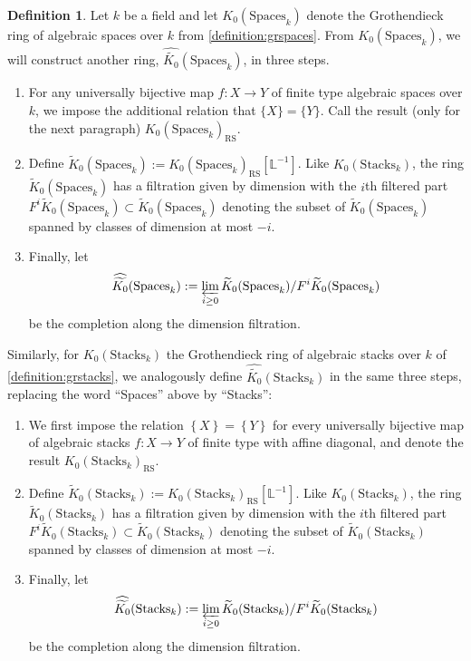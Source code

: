 \documentclass[12 pt]{amsart}
\newcommand{\rboxed}[1]{#1}
\theoremstyle{plain}
\theoremstyle{definition}
\newtheorem{definition}[theorem]{Definition}
\theoremstyle{remark}
\numberwithin{equation}{section}
\newcommand\bl{\mathbb L}
\newcommand\grSpaces{K_0(\mathrm{Spaces}_k)} %
\newcommand\grcSpaces{\widehat{\widetilde{K_0}}(\mathrm{Spaces}_k)} %
\newcommand\grStacks{K_0(\mathrm{Stacks}_k)} %
\newcommand\grcStacks{\widehat{\widetilde{K_0}}(\mathrm{Stacks}_k)} %
\begin{document}
\begin{definition}
	\label{definition:completed-grothendieck-ring} Let $k$ be a field and let $\rboxed{\grSpaces}$
	denote the Grothendieck ring of algebraic spaces over $k$ from
	\autoref{definition:grspaces}.  From
	$\grSpaces$, we will construct another ring, $\rboxed{\grcSpaces}$, in
	three steps.  
	\begin{enumerate}
		\item 	For any universally bijective map $f: X \to Y$ of
	finite type algebraic spaces over $k$, we impose the additional relation
	that $\{X\} = \{Y\}$.   Call the result  (only for the next paragraph)
	$\rboxed{K_0(\mathrm{Spaces}_k)_{\operatorname{RS}}}$.  
\item  Define
	$\rboxed{\widetilde{K}_0(\mathrm{Spaces}_k)} :=
	\rboxed{K_0(\mathrm{Spaces}_k)_{\operatorname{RS}}[\bl^{-1}]}$.   
	Like $\grStacks$,  the ring 
	$\widetilde{K}_0(\mathrm{Spaces}_k)$
has a filtration given by dimension with the $i$th filtered part
	$\rboxed{F^i \widetilde{K}_0(\mathrm{Spaces}_k)} \subset
	\widetilde{K}_0(\mathrm{Spaces}_k)$ denoting the subset of
	$\widetilde{K}_0(\mathrm{Spaces}_k)$ spanned by classes of dimension at
	most $-i$. 
\item  Finally, let $$\rboxed{\grcSpaces} := \varprojlim_{i \geq 0}
	\widetilde{K}_0(\mathrm{Spaces}_k)/ F^i
	\widetilde{K}_0(\mathrm{Spaces}_k)$$ be the completion along the
dimension filtration.  
	\end{enumerate}
Similarly, for $\grStacks$ the Grothendieck ring of algebraic stacks over $k$ of
\autoref{definition:grstacks}, we analogously define $\grcStacks$ in the same
three steps, replacing the word “Spaces” above by “Stacks”:
\begin{enumerate}
	\item We first impose the relation $\left\{ X \right\} = \left\{ Y
\right\}$ for every universally bijective map of algebraic stacks $f: X \to Y$
of finite type with affine diagonal,
and denote the result
$\rboxed{K_0(\mathrm{Stacks}_k)_{\operatorname{RS}}}$.  
	\item Define
	$\rboxed{\widetilde{K}_0(\mathrm{Stacks}_k)} :=
	\rboxed{K_0(\mathrm{Stacks}_k)_{\operatorname{RS}}[\bl^{-1}]}$.   
	Like $\grStacks$,  the ring 
	$\widetilde{K}_0(\mathrm{Stacks}_k)$
has a filtration given by dimension with the $i$th filtered part
	$\rboxed{F^i \widetilde{K}_0(\mathrm{Stacks}_k)} \subset
	\widetilde{K}_0(\mathrm{Stacks}_k)$ denoting the subset of
	$\widetilde{K}_0(\mathrm{Stacks}_k)$ spanned by classes of dimension at
	most $-i$. 
\item  Finally, let $$\rboxed{\grcStacks} := \varprojlim_{i \geq 0}
	\widetilde{K}_0(\mathrm{Stacks}_k)/ F^i
	\widetilde{K}_0(\mathrm{Stacks}_k)$$ be the completion along the
dimension filtration.  
\end{enumerate}
\end{definition} 
\end{document}

